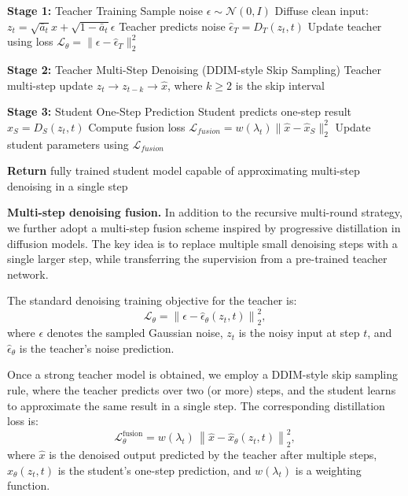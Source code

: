 \documentclass[conference]{IEEEtran}
\begin{document}
{\begin{algorithm}[t]
\begin{algorithmic}[1]
\State \textbf{Stage 1:} Teacher Training
    \State Sample noise $\epsilon \sim \mathcal{N}(0,I)$
    \State Diffuse clean input: $z_t = \sqrt{\bar{a}_t}x + \sqrt{1-\bar{a}_t}\epsilon$
    \State Teacher predicts noise $\hat{\epsilon}_T = D_T(z_t, t)$
    \State Update teacher using loss $\mathcal{L}_\theta = \|\epsilon - \hat{\epsilon}_T\|_2^2$
\EndFor

\State \textbf{Stage 2:} Teacher Multi-Step Denoising (DDIM-style Skip Sampling)
    \State Teacher multi-step update $z_t \rightarrow z_{t-k} \rightarrow \hat{x}$,
    where $k \ge 2$ is the skip interval
\EndFor

\State \textbf{Stage 3:} Student One-Step Prediction
    \State Student predicts one-step result $\hat{x}_S = D_S(z_t, t)$
    \State Compute fusion loss
    $\mathcal{L}_{fusion} = w(\lambda_t)\|\hat{x} - \hat{x}_S\|_2^2$
    \State Update student parameters using $\mathcal{L}_{fusion}$
\EndFor

\State \textbf{Return} fully trained student model capable of approximating
multi-step denoising in a single step

\end{algorithmic}
\end{algorithm}


\textbf{Multi-step denoising fusion.}  
In addition to the recursive multi-round strategy, we further adopt a multi-step fusion scheme inspired by progressive distillation in diffusion models. The key idea is to replace multiple small denoising steps with a single larger step, while transferring the supervision from a pre-trained teacher network.  

The standard denoising training objective for the teacher is:
\begin{equation}
\mathcal{L}_{\theta} = \left\| \epsilon - \hat{\epsilon}_{\theta}(z_t, t) \right\|_2^2 ,
\label{eq:teacher_loss}
\end{equation}
where $\epsilon$ denotes the sampled Gaussian noise, $z_t$ is the noisy input at step $t$, and $\hat{\epsilon}_{\theta}$ is the teacher’s noise prediction.  

Once a strong teacher model is obtained, we employ a DDIM-style skip sampling rule, where the teacher predicts over two (or more) steps, and the student learns to approximate the same result in a single step. The corresponding distillation loss is:
\begin{equation}
\mathcal{L}_{\theta}^{\text{fusion}} = w(\lambda_t) \, \left\| \hat{x} - \hat{x}_{\theta}(z_t, t) \right\|_2^2 ,
\label{eq:fusion_loss}
\end{equation}
where $\hat{x}$ is the denoised output predicted by the teacher after multiple steps, $\hat{x}_{\theta}(z_t, t)$ is the student’s one-step prediction, and $w(\lambda_t)$ is a weighting function.  

}
\end{document}
